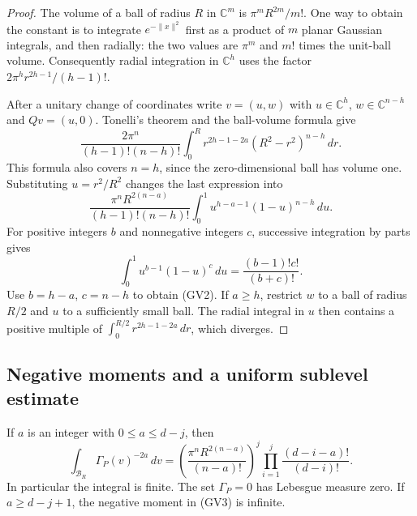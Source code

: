 \begin{proof}
The volume of a ball of radius $R$ in $\mathbb C^m$ is
$\pi^mR^{2m}/m!$.  One way to obtain the constant is to integrate
$e^{-\|x\|^2}$ first as a product of $m$ planar Gaussian integrals,
and then radially: the two values are $\pi^m$ and $m!$ times the
unit-ball volume.  Consequently radial integration in $\mathbb C^h$
uses the factor $2\pi^h r^{2h-1}/(h-1)!$.

After a unitary change of coordinates write $v=(u,w)$ with
$u\in\mathbb C^h$, $w\in\mathbb C^{n-h}$ and $Qv=(u,0)$.
Tonelli's theorem and the ball-volume formula give
\[
 \frac{2\pi^n}{(h-1)!(n-h)!}
   \int_0^R r^{2h-1-2a}(R^2-r^2)^{n-h}\,dr.
\]
This formula also covers $n=h$, since the zero-dimensional
ball has volume one.  Substituting $u=r^2/R^2$ changes the
last expression into
\[
 \frac{\pi^nR^{2(n-a)}}{(h-1)!(n-h)!}
   \int_0^1 u^{h-a-1}(1-u)^{n-h}\,du.
\]
For positive integers $b$ and nonnegative integers $c$,
successive integration by parts gives
\[
 \int_0^1 u^{b-1}(1-u)^c\,du
      =\frac{(b-1)!c!}{(b+c)!}.
\]
Use $b=h-a$, $c=n-h$ to obtain (GV2).
If $a\ge h$, restrict $w$ to a ball of radius $R/2$ and
$u$ to a sufficiently small ball.  The radial integral in
$u$ then contains a positive multiple of
$\int_0^{R/2}r^{2h-1-2a}\,dr$, which diverges.
\end{proof}

\subsection{Negative moments and a uniform sublevel estimate}

\begin{theorem}\label{gv-negative-moment}
If $a$ is an integer with $0\le a\le d-j$, then
\[
 \int_{\mathcal B_R}\Gamma_P(v)^{-2a}\,dv
 =\left(\frac{\pi^nR^{2(n-a)}}{(n-a)!}\right)^j
       \prod_{i=1}^j\frac{(d-i-a)!}{(d-i)!}.                  \tag{GV3}
\]
In particular the integral is finite.  The set $\Gamma_P=0$
has Lebesgue measure zero.  If $a\ge d-j+1$, the negative
moment in (GV3) is infinite.
\end{theorem}

